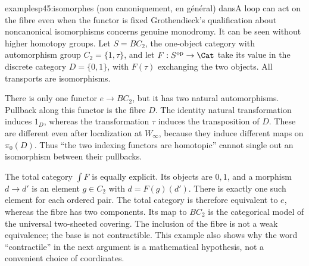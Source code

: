 \begin{dcomment}{examples}{p45:isomorphes (non canoniquement, en général) dans}{A loop can act on the fibre even when the functor is fixed}
Grothendieck's qualification about noncanonical isomorphisms concerns genuine monodromy. It can be seen without higher homotopy groups. Let $S=BC_2$, the one-object category with automorphism group $C_2=\{1,\tau\}$, and let $F:S^{\mathrm{op}}\to\Cat$ take its value in the discrete category $D=\{0,1\}$, with $F(\tau)$ exchanging the two objects. All transports are isomorphisms.

There is only one functor $e\to BC_2$, but it has two natural automorphisms. Pullback along this functor is the fibre $D$. The identity natural transformation induces $1_D$, whereas the transformation $\tau$ induces the transposition of $D$. These are different even after localization at $W_\infty$, because they induce different maps on $\pi_0(D)$. Thus ``the two indexing functors are homotopic'' cannot single out an isomorphism between their pullbacks.

The total category $\int F$ is equally explicit. Its objects are $0,1$, and a morphism $d\to d'$ is an element $g\in C_2$ with $d=F(g)(d')$. There is exactly one such element for each ordered pair. The total category is therefore equivalent to $e$, whereas the fibre has two components. Its map to $BC_2$ is the categorical model of the universal two-sheeted covering. The inclusion of the fibre is not a weak equivalence; the base is not contractible. This example also shows why the word ``contractile'' in the next argument is a mathematical hypothesis, not a convenient choice of coordinates.
\end{dcomment}

